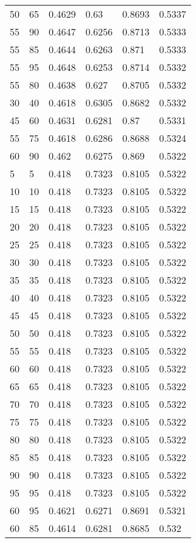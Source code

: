\begin{center}
\begin{longtable}{|l|l|l|l|l|l|}
50 & 65 & 0.4629 & 0.63   & 0.8693 & 0.5337 \\
55 & 90 & 0.4647 & 0.6256 & 0.8713 & 0.5333 \\
55 & 85 & 0.4644 & 0.6263 & 0.871  & 0.5333 \\
55 & 95 & 0.4648 & 0.6253 & 0.8714 & 0.5332 \\
55 & 80 & 0.4638 & 0.627  & 0.8705 & 0.5332 \\
30 & 40 & 0.4618 & 0.6305 & 0.8682 & 0.5332 \\
45 & 60 & 0.4631 & 0.6281 & 0.87   & 0.5331 \\
55 & 75 & 0.4618 & 0.6286 & 0.8688 & 0.5324 \\
60 & 90 & 0.462  & 0.6275 & 0.869  & 0.5322 \\
5  & 5  & 0.418  & 0.7323 & 0.8105 & 0.5322 \\
10 & 10 & 0.418  & 0.7323 & 0.8105 & 0.5322 \\
15 & 15 & 0.418  & 0.7323 & 0.8105 & 0.5322 \\
20 & 20 & 0.418  & 0.7323 & 0.8105 & 0.5322 \\
25 & 25 & 0.418  & 0.7323 & 0.8105 & 0.5322 \\
30 & 30 & 0.418  & 0.7323 & 0.8105 & 0.5322 \\
35 & 35 & 0.418  & 0.7323 & 0.8105 & 0.5322 \\
40 & 40 & 0.418  & 0.7323 & 0.8105 & 0.5322 \\
45 & 45 & 0.418  & 0.7323 & 0.8105 & 0.5322 \\
50 & 50 & 0.418  & 0.7323 & 0.8105 & 0.5322 \\
55 & 55 & 0.418  & 0.7323 & 0.8105 & 0.5322 \\
60 & 60 & 0.418  & 0.7323 & 0.8105 & 0.5322 \\
65 & 65 & 0.418  & 0.7323 & 0.8105 & 0.5322 \\
70 & 70 & 0.418  & 0.7323 & 0.8105 & 0.5322 \\
75 & 75 & 0.418  & 0.7323 & 0.8105 & 0.5322 \\
80 & 80 & 0.418  & 0.7323 & 0.8105 & 0.5322 \\
85 & 85 & 0.418  & 0.7323 & 0.8105 & 0.5322 \\
90 & 90 & 0.418  & 0.7323 & 0.8105 & 0.5322 \\
95 & 95 & 0.418  & 0.7323 & 0.8105 & 0.5322 \\
60 & 95 & 0.4621 & 0.6271 & 0.8691 & 0.5321 \\
60 & 85 & 0.4614 & 0.6281 & 0.8685 & 0.532  \\

\end{longtable}
\end{center}
